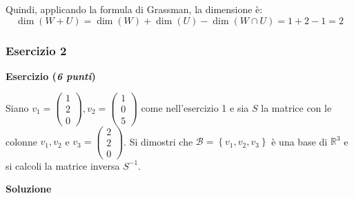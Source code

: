 \documentclass[a4paper]{article}
\begin{document}
	\noindent
	Quindi, applicando la formula di Grassman, la dimensione è:
	\begin{equation*}
		\dim\left(W+U\right) = \dim\left(W\right) + \dim\left(U\right) - \dim\left(W \cap U\right) = 1 + 2 - 1 = 2
	\end{equation*}\newpage

	\subsubsection{Esercizio 2}

	\textcolor{Red3}{\textbf{Esercizio (\emph{6 punti})}}\newline
	
	\noindent
	Siano $v_{1} = \begin{pmatrix}
		1 \\
		2 \\
		0
	\end{pmatrix}, v_{2} = \begin{pmatrix}
		1 \\
		0 \\
		5
	\end{pmatrix}$ come nell'esercizio 1 e sia $S$ la matrice con le colonne $v_{1}, v_{2}$ e $v_{3} = \begin{pmatrix}
		2 \\
		2 \\
		0
	\end{pmatrix}$. Si dimostri che $\mathcal{B} = \left\{v_{1}, v_{2}, v_{3}\right\}$ è una base di $\mathbb{R}^{3}$ e si calcoli la matrice inversa $S^{-1}$.\newline
	
	\noindent
	\textcolor{Green4}{\textbf{Soluzione}}\newline
	
\end{document}
